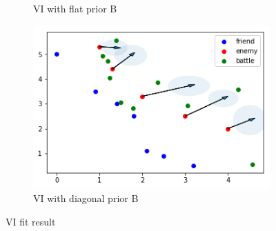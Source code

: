 \documentclass{article}
\begin{document}
\begin{figure}[h!]
\begin{subfigure}[b]{0.45\linewidth}
    \caption{VI with flat prior B}
  \end{subfigure}
  \begin{subfigure}[b]{0.45\linewidth}
    \includegraphics[width=\linewidth]{VI22.png}
    \caption{VI with diagonal prior B}
  \end{subfigure}
  \caption{VI fit result}
  \label{fig:VI}
\end{figure}
\end{document}
